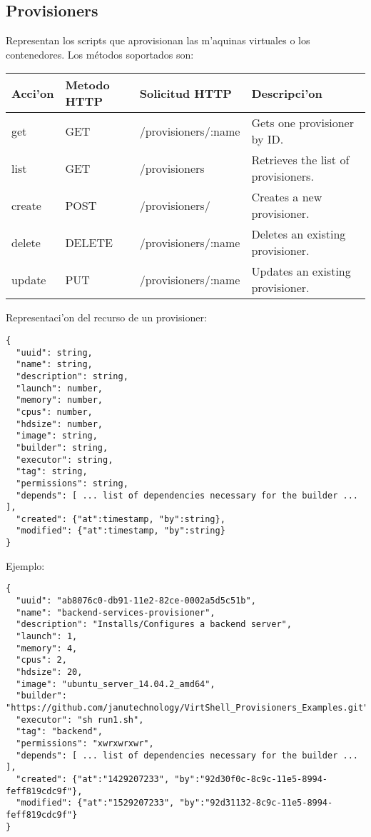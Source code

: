 \subsection{Provisioners}
Representan los scripts que aprovisionan las m'aquinas virtuales o los contenedores. Los métodos soportados son:

\begin{center}
 \begin{tabular}{| l | l | l | l |}
 \hline
  \rowcolor{blueapi}
  \textbf{Acci'on} & \textbf{Metodo HTTP} & \textbf{Solicitud HTTP} & \textbf{Descripci'on} \\ [0.5ex] 
  \hline\hline
  get & GET & /provisioners/:name & Gets one provisioner by ID. \\
  \hline
  list & GET & /provisioners & Retrieves the list of provisioners. \\
  \hline  
  create & POST & /provisioners/ & Creates a new provisioner. \\
  \hline
  delete & DELETE & /provisioners/:name & Deletes an existing provisioner. \\
  \hline  
  update & PUT & /provisioners/:name & Updates an existing provisioner. \\ [1ex] 
  \hline
\end{tabular}
\end{center}

Representaci'on del recurso de un provisioner:

\medskip
\begin{lstlisting}[style=json]
{
  "uuid": string,
  "name": string,
  "description": string,
  "launch": number,
  "memory": number,
  "cpus": number,
  "hdsize": number,
  "image": string,
  "builder": string,
  "executor": string,
  "tag": string,
  "permissions": string,
  "depends": [ ... list of dependencies necessary for the builder ... ],
  "created": {"at":timestamp, "by":string},
  "modified": {"at":timestamp, "by":string}
}

\end{lstlisting}

Ejemplo:

\medskip
\begin{lstlisting}[style=json]
{
  "uuid": "ab8076c0-db91-11e2-82ce-0002a5d5c51b",
  "name": "backend-services-provisioner",
  "description": "Installs/Configures a backend server",
  "launch": 1,
  "memory": 4,
  "cpus": 2,
  "hdsize": 20,
  "image": "ubuntu_server_14.04.2_amd64",
  "builder": "https://github.com/janutechnology/VirtShell_Provisioners_Examples.git",
  "executor": "sh run1.sh",
  "tag": "backend",
  "permissions": "xwrxwrxwr",
  "depends": [ ... list of dependencies necessary for the builder ... ],
  "created": {"at":"1429207233", "by":"92d30f0c-8c9c-11e5-8994-feff819cdc9f"},
  "modified": {"at":"1529207233", "by":"92d31132-8c9c-11e5-8994-feff819cdc9f"}
}
\end{lstlisting}

